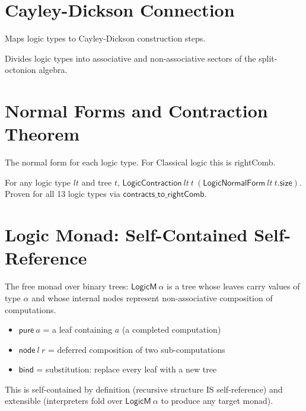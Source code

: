 \section{Cayley-Dickson Connection}

\begin{definition}[CD Step]
\label{def:cdstep}
\leanok
{}
Maps logic types to Cayley-Dickson construction steps.
\end{definition}

\begin{definition}
\label{def:split}
\leanok
{}
Divides logic types into associative and non-associative sectors of the split-octonion algebra.
\end{definition}

\section{Normal Forms and Contraction Theorem}

\begin{definition}
\label{def:logicnormal}
\leanok
{}
The normal form for each logic type. For Classical logic this is \textsf{rightComb}.
\end{definition}

\begin{theorem}
\label{thm:logic_contracts}
\leanok
{}
For any logic type $lt$ and tree $t$, $\mathsf{LogicContraction}\ lt\ t\ (\mathsf{LogicNormalForm}\ lt\ t.\mathsf{size})$.
Proven for all 13 logic types via $\mathsf{contracts\_to\_rightComb}$.
\end{theorem}

\section{Logic Monad: Self-Contained Self-Reference}

\begin{definition}
\label{def:logic_monad}
\leanok
{}
The free monad over binary trees: $\mathsf{LogicM}\ \alpha$ is a tree whose
leaves carry values of type $\alpha$ and whose internal nodes represent
non-associative composition of computations.
\begin{itemize}
  \item $\mathsf{pure}\ a$ = a leaf containing $a$ (a completed computation)
  \item $\mathsf{node}\ l\ r$ = deferred composition of two sub-computations
  \item $\mathsf{bind}$ = substitution: replace every leaf with a new tree
\end{itemize}
This is self-contained by definition (recursive structure IS self-reference)
and extensible (interpreters fold over $\mathsf{LogicM}\ \alpha$ to produce
any target monad).
\end{definition}

